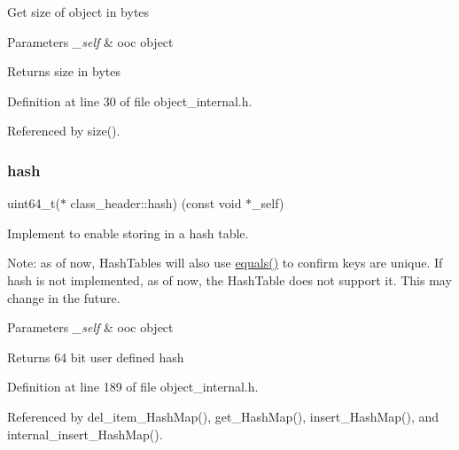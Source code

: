Get size of object in bytes 
\begin{DoxyParams}{Parameters}
{\em \+\_\+self} & ooc object \\
\hline
\end{DoxyParams}
\begin{DoxyReturn}{Returns}
size in bytes 
\end{DoxyReturn}


Definition at line 30 of file object\+\_\+internal.\+h.



Referenced by size().

\mbox{\label{structclass__header_aa0035a2c833b1e46f0ae401d6b44ee65}} 
\subsubsection{\texorpdfstring{hash}{hash}}
{\footnotesize\ttfamily uint64\+\_\+t($\ast$ class\+\_\+header\+::hash) (const void $\ast$\+\_\+self)}

Implement to enable storing in a hash table.

Note\+: as of now, Hash\+Tables will also use \mbox{\hyperlink{structclass__header_a01dc6aae9011475ec7be8500d4f63c5b}{equals()}} to confirm keys are unique. If hash is not implemented, as of now, the Hash\+Table does not support it. This may change in the future.


\begin{DoxyParams}{Parameters}
{\em \+\_\+self} & ooc object \\
\hline
\end{DoxyParams}
\begin{DoxyReturn}{Returns}
64 bit user defined hash 
\end{DoxyReturn}


Definition at line 189 of file object\+\_\+internal.\+h.



Referenced by del\+\_\+item\+\_\+\+Hash\+Map(), get\+\_\+\+Hash\+Map(), insert\+\_\+\+Hash\+Map(), and internal\+\_\+insert\+\_\+\+Hash\+Map().

\mbox{\label{structclass__header_ada4fc11b4f09e8248a28c7d2e39e17ea}} 

